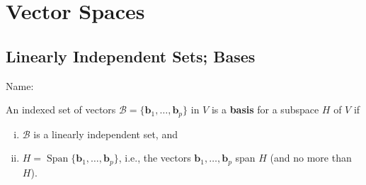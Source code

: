\documentclass[10pt]{book}
\newcommand{\boxcolor}{gray!30}
\newenvironment{boxdef}{\begin{mdframed}[backgroundcolor=\boxcolor,linewidth=0pt,nobreak=true]}{\end{mdframed}}
\theoremstyle{definition}
\newcommand{\name}[1][2.5in]{\vspace{-2.3em}\hfill Name: \underline{\hspace{#1}}}
\newcommand{\B}{\mathscr{B}}
\newcommand{\vect}[1]{\ensuremath{\boldsymbol{\mathbf{#1}}}}
\DeclareMathOperator{\Span}{Span}
\newcommand{\vectset}[3][v]{\{\vect{#1}_{#2},\ldots,\vect{#1}_{#3}\}}
\begin{document}


\newpage


\chapter{Vector Spaces}
\setcounter{section}{0}




\setcounter{section}{2}
\section{Linearly Independent Sets; Bases}
\name[2in]


\begin{boxdef}
An indexed set of vectors $\B=\vectset[b]{1}{p}$ in $V$ is a \textbf{basis} for a subspace $H$ of $V$ if
\begin{enumerate}[(i)]
	\item $\B$ is a linearly independent set, and
	\item $H=\Span\vectset[b]{1}{p}$, i.e., the vectors $\vect{b}_1,\ldots,\vect{b}_p$ span $H$ (and no more than $H$).
\end{enumerate}
\end{boxdef}
\end{document}
